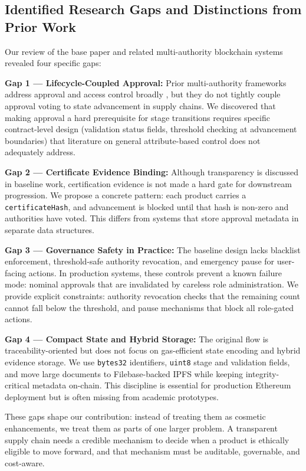\documentclass[conference]{IEEEtran}
\begin{document}
\subsection{Identified Research Gaps and Distinctions from Prior Work}

Our review of the base paper and related multi-authority blockchain systems revealed four specific gaps:

\textbf{Gap 1 --- Lifecycle-Coupled Approval:} Prior multi-authority frameworks address approval and access control broadly \cite{researchgate2022,wjarr2024}, but they do not tightly couple approval voting to state advancement in supply chains. We discovered that making approval a hard prerequisite for stage transitions requires specific contract-level design (validation status fields, threshold checking at advancement boundaries) that literature on general attribute-based control does not adequately address.

\textbf{Gap 2 --- Certificate Evidence Binding:} Although transparency is discussed in baseline work, certification evidence is not made a hard gate for downstream progression. We propose a concrete pattern: each product carries a \texttt{certificateHash}, and advancement is blocked until that hash is non-zero and authorities have voted. This differs from systems that store approval metadata in separate data structures.

\textbf{Gap 3 --- Governance Safety in Practice:} The baseline design lacks blacklist enforcement, threshold-safe authority revocation, and emergency pause for user-facing actions. In production systems, these controls prevent a known failure mode: nominal approvals that are invalidated by careless role administration. We provide explicit constraints: authority revocation checks that the remaining count cannot fall below the threshold, and pause mechanisms that block all role-gated actions.

\textbf{Gap 4 --- Compact State and Hybrid Storage:} The original flow is traceability-oriented but does not focus on gas-efficient state encoding and hybrid evidence storage. We use \texttt{bytes32} identifiers, \texttt{uint8} stage and validation fields, and move large documents to Filebase-backed IPFS while keeping integrity-critical metadata on-chain. This discipline is essential for production Ethereum deployment but is often missing from academic prototypes.

These gaps shape our contribution: instead of treating them as cosmetic enhancements, we treat them as parts of one larger problem. A transparent supply chain needs a credible mechanism to decide when a product is ethically eligible to move forward, and that mechanism must be auditable, governable, and cost-aware.
\end{document}
